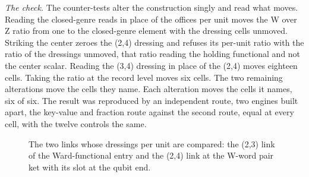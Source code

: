 \begin{chproof}
\textit{The check.} The counter-tests alter the construction singly and read what moves. Reading the closed-genre reads in place of the offices per unit moves the W over Z ratio from one to the closed-genre element with the dressing cells unmoved. Striking the center zeroes the (2,4) dressing and refuses its per-unit ratio with the ratio of the dressings unmoved, that ratio reading the holding functional and not the center scalar. Reading the (3,4) dressing in place of the (2,4) moves eighteen cells. Taking the ratio at the record level moves six cells. The two remaining alterations move the cells they name. Each alteration moves the cells it names, six of six. The result was reproduced by an independent route, two engines built apart, the key-value and fraction route against the second route, equal at every cell, with the twelve controls the same.
\begin{figure}[h]\centering{}\caption{The two links whose dressings per unit are compared: the (2,3) link of the Ward-functional entry and the (2,4) link at the W-word pair ket with its slot at the qubit end.}\end{figure}
\end{chproof}

